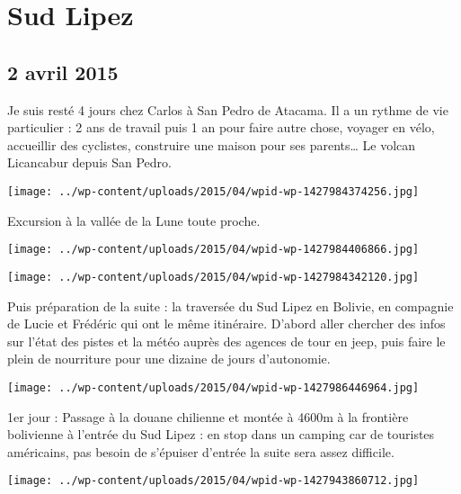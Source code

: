 \chapter{Sud Lipez}
\section*{2 avril 2015}
Je suis resté 4 jours chez Carlos à San Pedro de Atacama. \newline
 Il a un rythme de vie particulier : 2 ans de travail puis 1 an pour faire autre chose, voyager en vélo, accueillir des cyclistes, construire une maison pour ses parents… \newline
 Le volcan Licancabur depuis San Pedro. \newline
 \newline
\centerline{\texttt{[image: ../wp-content/uploads/2015/04/wpid-wp-1427984374256.jpg]} } 
 \newline
 Excursion à la vallée de la Lune toute proche. \newline
 \newline
\centerline{\texttt{[image: ../wp-content/uploads/2015/04/wpid-wp-1427984406866.jpg]} } 
 \newline
 \newline
\centerline{\texttt{[image: ../wp-content/uploads/2015/04/wpid-wp-1427984342120.jpg]} } 
 \newline
 Puis préparation de la suite : la traversée du Sud Lipez en Bolivie, en compagnie de Lucie et Frédéric qui ont le même itinéraire. \newline
 D'abord aller chercher des infos sur l'état des pistes et la météo auprès des agences de tour en jeep, puis faire le plein de nourriture pour une dizaine de jours d'autonomie. \newline
 \newline
\centerline{\texttt{[image: ../wp-content/uploads/2015/04/wpid-wp-1427986446964.jpg]} } 
 \newline
 1er jour : \newline
 Passage à la douane chilienne et montée à 4600m à la frontière bolivienne à l'entrée du Sud Lipez : en stop dans un camping car de touristes américains, pas besoin de s'épuiser d'entrée la suite sera assez difficile. \newline
 \newline
\centerline{\texttt{[image: ../wp-content/uploads/2015/04/wpid-wp-1427943860712.jpg]} } 
 \newline
